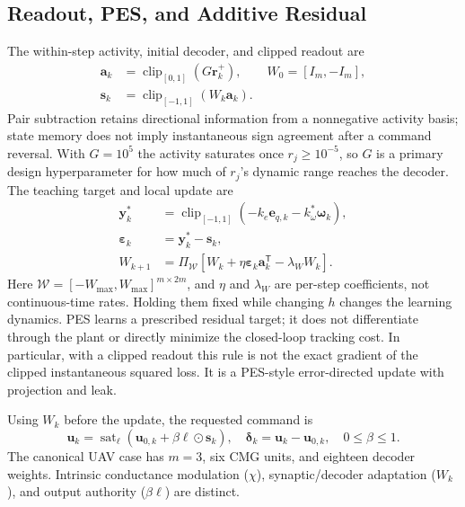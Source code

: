 \documentclass[letterpaper, 10 pt, conference]{ieeeconf}
\newcommand{\T}{^{\mathsf T}}
\newcommand{\sat}{\operatorname{sat}}
\newcommand{\clip}{\operatorname{clip}}
\begin{document}
\subsection{Readout, PES, and Additive Residual}
The within-step activity, initial decoder, and clipped readout are
\begin{equation}
 \begin{aligned}
 \bm a_k&=\clip_{[0,1]}(G\bm r_k^+),\qquad W_0=[I_m,-I_m],\\
 \bm s_k&=\clip_{[-1,1]}(W_k\bm a_k).
 \end{aligned}
 \label{eq:readout}
\end{equation}
Pair subtraction retains directional information from a nonnegative
activity basis; state memory does not imply instantaneous sign agreement
after a command reversal. With $G=10^5$ the activity saturates once
$r_j\ge10^{-5}$, so $G$ is a primary design hyperparameter for how much of
$r_j$'s dynamic range reaches the decoder. The teaching target and local update are
\begin{align}
 \bm y_k^*&=\clip_{[-1,1]}(-k_e\bm e_{q,k}-k_\omega^*\bm\omega_k),\\
 \bm\varepsilon_k&=\bm y_k^*-\bm s_k,\\
 W_{k+1}&=\Pi_{\mathcal W}
       [W_k+\eta\bm\varepsilon_k\bm a_k\T-\lambda_W W_k].
 \label{eq:pes}
\end{align}
Here $\mathcal W=[-W_{\max},W_{\max}]^{m\times2m}$, and
$\eta$ and $\lambda_W$ are per-step coefficients, not continuous-time
rates. Holding them fixed while changing $h$ changes the learning dynamics.
PES learns a prescribed residual target; it does not differentiate through
the plant or directly minimize the closed-loop tracking cost. In particular,
with a clipped readout this rule is not the exact gradient of the clipped
instantaneous squared loss. It is a PES-style error-directed update with
projection and leak.

Using $W_k$ before the update, the requested command is
\begin{equation}
 \bm u_k=\sat_{\bm\ell}(\bm u_{0,k}+\beta\bm\ell\odot\bm s_k),\quad
 \bm\delta_k=\bm u_k-\bm u_{0,k},\quad 0\le\beta\le1.
 \label{eq:residual}
\end{equation}
The canonical UAV case has $m=3$, six CMG units, and eighteen decoder
weights. Intrinsic conductance modulation ($\chi$), synaptic/decoder
adaptation ($W_k$), and output authority ($\beta\bm\ell$) are distinct.
\end{document}

